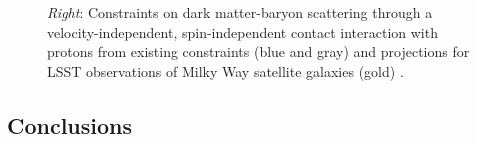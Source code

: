 \documentclass[12pt]{article}
\begin{document}
\begin{figure}[t]
{    %
    \emph{Right}: Constraints on dark matter-baryon scattering through a velocity-independent, spin-independent contact interaction with protons from existing constraints (blue and gray) and projections for LSST observations of Milky Way satellite galaxies (gold) \citep{drlica-wagner_2019_lsst_dark_matter,Gluscevic:prep}.
}
\end{figure}

\vspace{-1em} \subsection*{Conclusions} \vspace{-0.5em}
\end{document}
